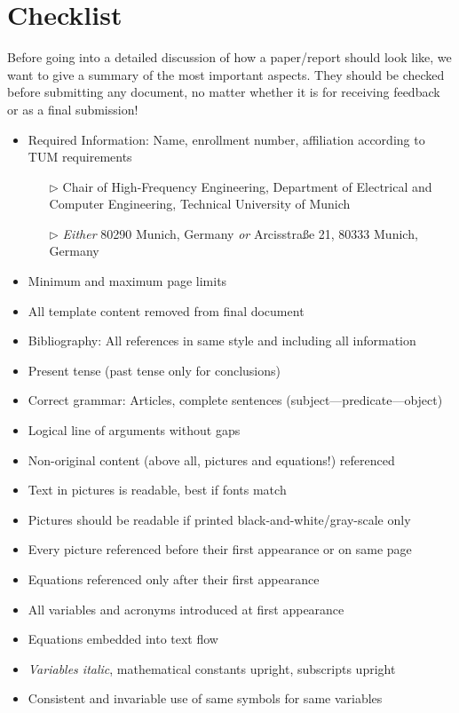 \chapter*{Checklist} %
Before going into a detailed discussion of how a paper/report should look like, we want to give a summary of the most important aspects. 
They should be checked before submitting any document, no matter whether it is for receiving feedback or as a final submission! 

\begin{itemize}
  \renewcommand\labelitemi{\Large$\Box$} %
  \item Required Information: Name, enrollment number, affiliation according to TUM requirements
   \begin{itemize}
     \item[$\triangleright$] Chair of High-Frequency Engineering, Department of Electrical and 
                             Computer Engineering, Technical University of Munich
     \item[$\triangleright$] \emph{Either} 80290 Munich, Germany 
                             \emph{or}     Arcisstraße 21, 80333 Munich, Germany
   \end{itemize}
  \item Minimum and maximum page limits
  \item All template content removed from final document
  \item Bibliography: All references in same style and including all information
  \item Present tense (past tense only for conclusions)
  \item Correct grammar: Articles, complete sentences (subject---predicate---object)
  \item Logical line of arguments without gaps
  \item Non-original content (above all, pictures and equations!) referenced
  \item Text in pictures is readable, best if fonts match
  \item Pictures should be readable if printed black-and-white/gray-scale only
  \item Every picture referenced before their first appearance or on same page
  \item Equations referenced only after their first appearance
  \item All variables and acronyms introduced at first appearance
  \item Equations embedded into text flow
  \item \emph{Variables italic}, mathematical constants upright, subscripts upright
  \item Consistent and invariable use of same symbols for same variables
\end{itemize}

